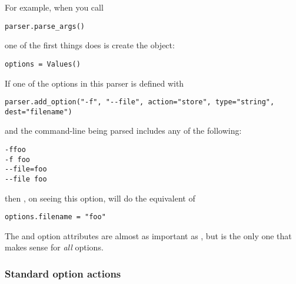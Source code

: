 For example, when you call
\begin{verbatim}
parser.parse_args()
\end{verbatim}

one of the first things  does is create the  object:
\begin{verbatim}
options = Values()
\end{verbatim}

If one of the options in this parser is defined with
\begin{verbatim}
parser.add_option("-f", "--file", action="store", type="string", dest="filename")
\end{verbatim}

and the command-line being parsed includes any of the following:
\begin{verbatim}
-ffoo
-f foo
--file=foo
--file foo
\end{verbatim}

then , on seeing this option, will do the equivalent of
\begin{verbatim}
options.filename = "foo"
\end{verbatim}

The  and  option attributes are almost as important as
, but  is the only one that makes sense for \emph{all}
options.


\subsubsection{Standard option actions\label{optparse-standard-option-actions}}

